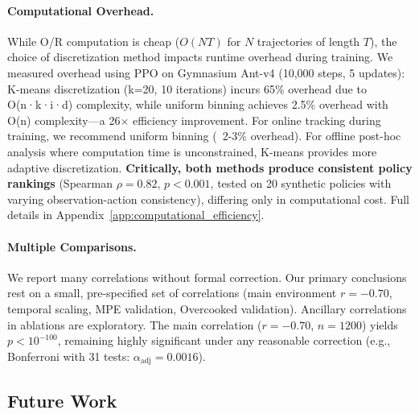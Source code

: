 \documentclass[twoside]{article}
\theoremstyle{remark}
\begin{document}
\paragraph{Computational Overhead.}
While O/R computation is cheap ($O(NT)$ for $N$ trajectories of length $T$), the choice of discretization method impacts runtime overhead during training. We measured overhead using PPO on Gymnasium Ant-v4 (10,000 steps, 5 updates): K-means discretization (k=20, 10 iterations) incurs 65\% overhead due to O(n·k·i·d) complexity, while uniform binning achieves 2.5\% overhead with O(n) complexity—a 26× efficiency improvement. For online tracking during training, we recommend uniform binning (~2-3\% overhead). For offline post-hoc analysis where computation time is unconstrained, K-means provides more adaptive discretization. \textbf{Critically, both methods produce consistent policy rankings} (Spearman $\rho = 0.82$, $p < 0.001$, tested on 20 synthetic policies with varying observation-action consistency), differing only in computational cost. Full details in Appendix~\ref{app:computational_efficiency}.

\paragraph{Multiple Comparisons.}
We report many correlations without formal correction. Our primary conclusions rest on a small, pre-specified set of correlations (main environment $r = -0.70$, temporal scaling, MPE validation, Overcooked validation). Ancillary correlations in ablations are exploratory. The main correlation ($r = -0.70$, $n = 1200$) yields $p < 10^{-100}$, remaining highly significant under any reasonable correction (e.g., Bonferroni with 31 tests: $\alpha_{\text{adj}} = 0.0016$).

\subsection{Future Work}
\end{document}
